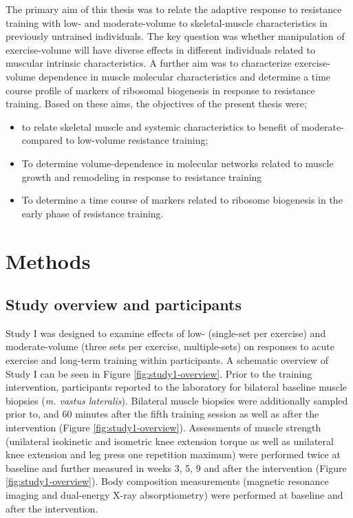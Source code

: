 \documentclass[twoside,10pt]{gihclass} %
\providecommand{\tightlist}{%
  \setlength{\itemsep}{0pt}\setlength{\parskip}{0pt}}
\begin{document}
The primary aim of this thesis was to relate the adaptive response to resistance training with low- and moderate-volume to skeletal-muscle characteristics in previously untrained individuals. The key question was whether manipulation of exercise-volume will have diverse effects in different individuals related to muscular intrinsic characteristics. A further aim was to characterize exercise-volume dependence in muscle molecular characteristics and determine a time course profile of markers of ribosomal biogenesis in response to resistance training. Based on these aims, the objectives of the present thesis were;
\begin{itemize}
\tightlist
\item
  to relate skeletal muscle and systemic characteristics to benefit of moderate- compared to low-volume resistance training;
\item
  To determine volume-dependence in molecular networks related to muscle growth and remodeling in response to resistance training
\item
  To determine a time course of markers related to ribosome biogenesis in the early phase of resistance training.
\end{itemize}
\hypertarget{methods}{%
\chapter{Methods}\label{methods}}

\hypertarget{study-overview-and-participants}{%
\section{Study overview and participants}\label{study-overview-and-participants}}

Study I was designed to examine effects of low- (single-set per exercise) and moderate-volume (three sets per exercise, multiple-sets) on
responses to acute exercise and long-term training within participants.
A schematic overview of Study I can be seen in Figure \ref{fig:study1-overview}.
Prior to the training intervention, participants reported to the laboratory for bilateral baseline muscle biopsies (\emph{m. vastus lateralis}).
Bilateral muscle biopsies were additionally sampled prior to, and 60 minutes after the fifth training session as well as after the intervention (Figure \ref{fig:study1-overview}).
Assessments of muscle strength (unilateral isokinetic and isometric knee extension torque as well as unilateral knee extension and leg press one repetition maximum) were performed twice at baseline and further measured in weeks 3, 5, 9 and after the intervention (Figure \ref{fig:study1-overview}).
Body composition measurements (magnetic resonance imaging and dual-energy X-ray absorptiometry) were performed at baseline and after the intervention.
\end{document}
